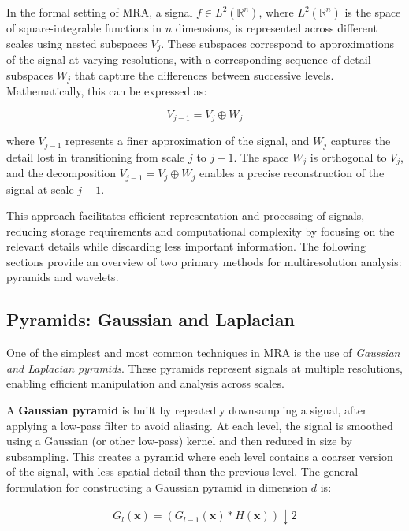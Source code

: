 In the formal setting of MRA, a signal \( f \in L^2(\mathbb{R}^n) \), where \( L^2(\mathbb{R}^n) \) is the space of square-integrable functions in \( n \) dimensions, is represented across different scales using nested subspaces \( V_j \). These subspaces correspond to approximations of the signal at varying resolutions, with a corresponding sequence of detail subspaces \( W_j \) that capture the differences between successive levels. Mathematically, this can be expressed as:

\[
V_{j-1} = V_j \oplus W_j
\]

where \( V_{j-1} \) represents a finer approximation of the signal, and \( W_j \) captures the detail lost in transitioning from scale \( j \) to \( j-1 \). The space \( W_j \) is orthogonal to \( V_j \), and the decomposition \( V_{j-1} = V_j \oplus W_j \) enables a precise reconstruction of the signal at scale \( j-1 \).

This approach facilitates efficient representation and processing of signals, reducing storage requirements and computational complexity by focusing on the relevant details while discarding less important information. The following sections provide an overview of two primary methods for multiresolution analysis: pyramids and wavelets.

\subsection{Pyramids: Gaussian and Laplacian}

One of the simplest and most common techniques in MRA is the use of \textit{Gaussian and Laplacian pyramids}. These pyramids represent signals at multiple resolutions, enabling efficient manipulation and analysis across scales.

A \textbf{Gaussian pyramid} is built by repeatedly downsampling a signal, after applying a low-pass filter to avoid aliasing. At each level, the signal is smoothed using a Gaussian (or other low-pass) kernel and then reduced in size by subsampling. This creates a pyramid where each level contains a coarser version of the signal, with less spatial detail than the previous level. The general formulation for constructing a Gaussian pyramid in dimension \(d\) is:

\begin{align}
  G_l(\mathbf{x}) = (G_{l-1}(\mathbf{x}) * H(\mathbf{x})) \downarrow 2
\end{align}

